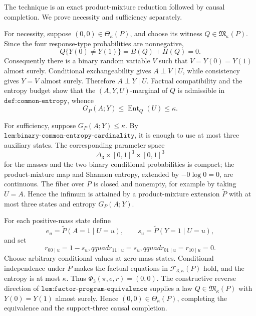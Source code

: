 The technique is an exact product-mixture reduction followed by causal completion.  We prove necessity and sufficiency separately.

For necessity, suppose \((0,0)\in\Theta_\kappa(P)\), and choose its witness \(Q\in\mathfrak M_\kappa(P)\).  Since the four response-type probabilities are nonnegative,
\[
 Q\{Y(0)\neq Y(1)\}=B(Q)+H(Q)=0.
\]
Consequently there is a binary random variable \(V\) such that \(V=Y(0)=Y(1)\) almost surely.  Conditional exchangeability gives \(A\perp V\mid U\), while consistency gives \(Y=V\) almost surely.  Therefore \(A\perp Y\mid U\).  Factual compatibility and the entropy budget show that the \((A,Y,U)\)-marginal of \(Q\) is admissible in \(\texttt{def:common-entropy}\), whence
\[
 G_P(A;Y)\leq \operatorname{Ent}_Q(U)\leq\kappa.
\]

For sufficiency, suppose \(G_P(A;Y)\leq\kappa\).  By \(\texttt{lem:binary-common-entropy-cardinality}\), it is enough to use at most three auxiliary states.  The corresponding parameter space
\[
 \Delta_3\times[0,1]^3\times[0,1]^3
\]
for the masses and the two binary conditional probabilities is compact; the product-mixture map and Shannon entropy, extended by \(-0\log0=0\), are continuous.  The fiber over \(P\) is closed and nonempty, for example by taking \(U=A\).  Hence the infimum is attained by a product-mixture extension \(\widetilde P\) with at most three states and entropy \(G_P(A;Y)\).

For each positive-mass state define
\[
 e_u=\widetilde P(A=1\mid U=u),\qquad
 s_u=\widetilde P(Y=1\mid U=u),
\]
and set
\[
 r_{00\mid u}=1-s_u,qquad r_{11\mid u}=s_u,qquad
 r_{01\mid u}=r_{10\mid u}=0.
\]
Choose arbitrary conditional values at zero-mass states.  Conditional independence under \(\widetilde P\) makes the factual equations in \(\mathcal F_{3,\kappa}(P)\) hold, and the entropy is at most \(\kappa\).  Thus \(\Phi_3(\pi,e,r)=(0,0)\).  The constructive reverse direction of \(\texttt{lem:factor-program-equivalence}\) supplies a law \(Q\in\mathfrak M_\kappa(P)\) with \(Y(0)=Y(1)\) almost surely.  Hence \((0,0)\in\Theta_\kappa(P)\), completing the equivalence and the support-three causal completion.
